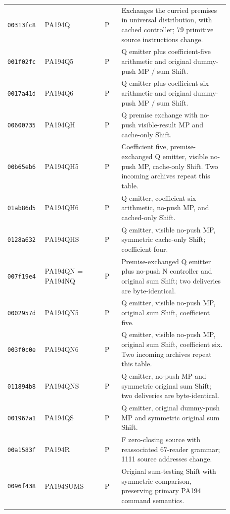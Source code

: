 \begin{longtable}{p{0.12\linewidth}p{0.25\linewidth}p{0.07\linewidth}p{0.45\linewidth}}
\texttt{00313fc8} & PA194Q & P & Exchanges the curried premises in universal distribution, with cached controller; 79 primitive source instructions change. \\ \addlinespace[2pt]
\texttt{001f02fc} & PA194Q5 & P & Q emitter plus coefficient-five arithmetic and original dummy-push MP / sum Shift. \\ \addlinespace[2pt]
\texttt{0017a41d} & PA194Q6 & P & Q emitter plus coefficient-six arithmetic and original dummy-push MP / sum Shift. \\ \addlinespace[2pt]
\texttt{00600735} & PA194QH & P & Q premise exchange with no-push visible-result MP and cache-only Shift. \\ \addlinespace[2pt]
\texttt{00b65eb6} & PA194QH5 & P & Coefficient five, premise-exchanged Q emitter, visible no-push MP, cache-only Shift. Two incoming archives repeat this table. \\ \addlinespace[2pt]
\texttt{01ab86d5} & PA194QH6 & P & Q emitter, coefficient-six arithmetic, no-push MP, and cached-only Shift. \\ \addlinespace[2pt]
\texttt{0128a632} & PA194QHS & P & Q emitter, visible no-push MP, symmetric cache-only Shift; coefficient four. \\ \addlinespace[2pt]
\texttt{007f19e4} & PA194QN = PA194NQ & P & Premise-exchanged Q emitter plus no-push N controller and original sum Shift; two deliveries are byte-identical. \\ \addlinespace[2pt]
\texttt{0002957d} & PA194QN5 & P & Q emitter, visible no-push MP, original sum Shift, coefficient five. \\ \addlinespace[2pt]
\texttt{003f0c0e} & PA194QN6 & P & Q emitter, visible no-push MP, original sum Shift, coefficient six. Two incoming archives repeat this table. \\ \addlinespace[2pt]
\texttt{011894b8} & PA194QNS & P & Q emitter, no-push MP and symmetric original sum Shift; two deliveries are byte-identical. \\ \addlinespace[2pt]
\texttt{001967a1} & PA194QS & P & Q emitter, original dummy-push MP and symmetric original sum Shift. \\ \addlinespace[2pt]
\texttt{00a1583f} & PA194R & P & F zero-closing source with reassociated 67-reader grammar; 1111 source addresses change. \\ \addlinespace[2pt]
\texttt{0096f438} & PA194SUMS & P & Original sum-testing Shift with symmetric comparison, preserving primary PA194 command semantics. \\ \addlinespace[2pt]

\end{longtable}
